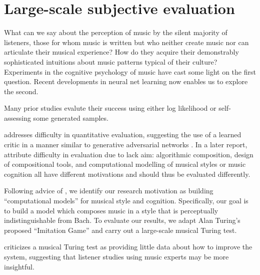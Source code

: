 \chapter{Large-scale subjective evaluation}
\begin{savequote}[75mm]
  What can we say about the perception of music by the silent majority of
  listeners, those for whom music is written but who neither create music nor
  can articulate their musical experience? How do they acquire their
  demonstrably sophisticated intuitions about music patterns
  typical of their culture? Experiments in the cognitive psychology of music
  have cast some light on the first question. Recent developments in neural net learning
  now enables us to explore the second.
\end{savequote}


\ifpdf
    \graphicspath{{Chapter6/Figs/Raster/}{Chapter6/Figs/PDF/}{Chapter6/Figs/}}
\else
    \graphicspath{{Chapter6/Figs/Vector/}{Chapter6/Figs/}}
\fi

Many prior studies \citep{Eck2002-blues,Allan2005,Boulanger-Lewandowski2012,Lyu2015}
evalute their success using either log likelihood or self-assessing
some generated samples.

\citep{pearce2001towards} addresses difficulty in quantitative evaluation,
suggesting the use of a learned critic in a manner similar to generative
adversarial networks \citep{goodfellow2014generative}. In a later report,
\citep{pearce2002motivations} attribute difficulty in evaluation due to lack
aim: algorithmic composition, design of compositional tools, and computational
modelling of musical styles or music cognition all have different motivations
and should thus be evaluated differently.

Following advice of \citep{pearce2002motivations}, we identify our research
motivation as building ``computational models'' for musical style and cognition.
Specifically, our goal is to build a model which composes music in a style
that is perceptually indistinguishable from Bach.
To evaluate our results, we adapt Alan Turing's proposed ``Imitation Game''
\citep{turing1950computing} and carry out a large-scale musical Turing test.

\citep{ariza2009interrogator} criticizes a musical Turing test as providing little data about
how to improve the system, suggesting that listener studies using music experts
may be more insightful.

